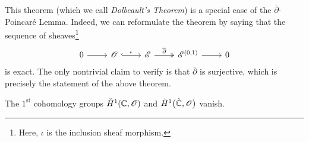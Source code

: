 \documentclass[../Moduli_Spaces_of_Riemann_Surfaces.tex]{subfiles}
\begin{document}
    \begin{remark}
        This theorem (which we call \textit{Dolbeault's Theorem}) is a special case of the $\bar{\partial}$-Poincaré Lemma. Indeed, we can reformulate the theorem by saying that the sequence of sheaves\footnote{Here, $\iota$ is the inclusion sheaf morphism.}
        \begin{equation*}
            \begin{tikzcd}
                0 \ar[r] & \HOLO \ar[r, "\iota", hookrightarrow] & \DIFF \ar[r, "\bar{\partial}", twoheadrightarrow] & \DIFF^{\l(0,1\r)} \ar[r] & 0
            \end{tikzcd}
        \end{equation*}
        is exact. The only nontrivial claim to verify is that $\bar{\partial}$ is surjective, which is precisely the statement of the above theorem.\exqed
    \end{remark}
    \begin{corollary}\label{3.3:cor:vanishing_of_H_Riemann_sphere}
        The $1^\textrm{st}$ cohomology groups $\check{H}^1\!\left(\mathbb{C},\mathscr{O}\right)$ and $\check{H}^1\big(\hat{\mathbb{C}},\mathscr{O}\big)$ vanish.
    \end{corollary}
\end{document}
